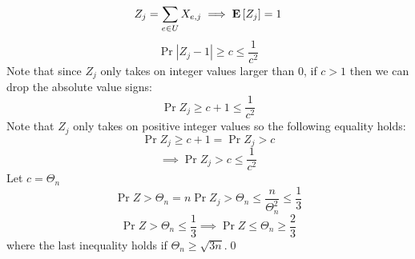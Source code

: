 \documentclass[12pt]{article}
\begin{document}
\begin{solution}
\begin{enumerate}[label=(\alph*)]
\[
Z_j = \sum_{e\in U}{X_{e,j}} \implies \mathbf{E}\left[Z_j\right] = 1
\]
\[
\Pr{|Z_j -1| \geq c} \leq \frac{1}{c^2}
\]
Note that since $Z_j$ only takes on integer values larger than $0$, if $c >1$ then we can drop the absolute value signs:
\[
\Pr{Z_j \geq c + 1} \leq \frac{1}{c^2}
\]
Note that $Z_j$ only takes on positive integer values so the following equality holds: 
\[
\Pr{Z_j \geq c + 1} = \Pr{Z_j > c}
\]
\[
\implies \Pr{Z_j > c} \leq \frac{1}{c^2}
\]
Let $c = \Theta_n$
\[
\Pr{Z > \Theta_n} = n\Pr{Z_j > \Theta_n} \leq \frac{n}{\Theta^2_n} \leq \frac{1}{3}
\]
\[
\Pr{Z > \Theta_n} \leq \frac{1}{3} \implies \Pr{Z \leq \Theta_n} \geq \frac{2}{3}
\]
where the last inequality holds if $\Theta_n \geq \sqrt{3n}$.\qed


\end{enumerate}
\end{solution}
\end{document}
